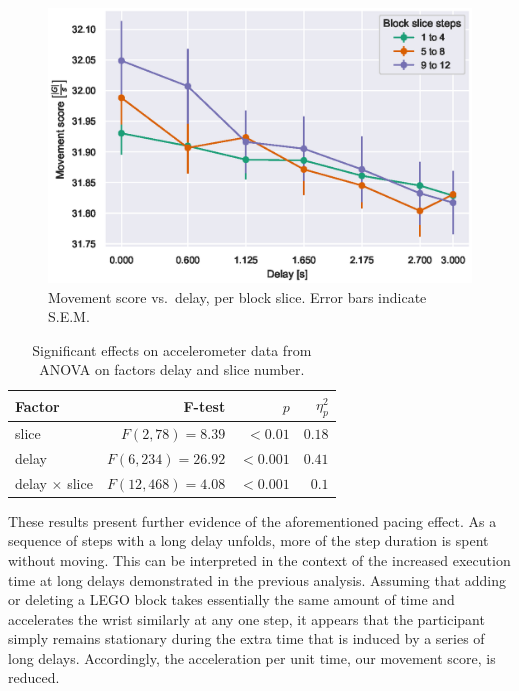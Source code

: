 \documentclass[10pt,letterpaper]{article}
\begin{document}
\begin{figure}[h]
  \centering
  \includegraphics[width=.8\textwidth]{plots/acc_vs_delay_per_slice.eps}
  \caption{Movement score vs.\ delay, per block slice. Error bars indicate S.E.M.}\label{fig:acc:delayslice}
\end{figure}

\begin{table}[h]
  \centering
  \caption{Significant effects on accelerometer data from ANOVA on factors delay and slice number.}\label{tab:anova:acc:slice}
  \setlength{\tabcolsep}{0pt} %
  \begin{tabular*}{\columnwidth}{@{\extracolsep{\fill}\quad}lrrr@{}}
    \toprule
    \textbf{Factor} & \textbf{F-test} & \textbf{\(p\)} & \textbf{\(\eta^{2}_{p}\)} \\
    \midrule 
    slice & \(F(2, 78) = 8.39\) & \(<0.01\) & \(0.18\) \\
    delay & \(F(6, 234) = 26.92\) & \(<0.001\) & \(0.41\) \\
    delay \(\times\) slice & \(F(12, 468) = 4.08\) & \(<0.001\) & \(0.1\) \\
    \bottomrule
  \end{tabular*}%
\end{table}

These results present further evidence of the aforementioned pacing effect.
As a sequence of steps with a long delay unfolds, more of the step duration is spent without moving.
This can be interpreted in the context of the increased execution time at long delays demonstrated in the previous analysis.
Assuming that adding or deleting a LEGO block takes essentially the same amount of time and accelerates the wrist similarly at any one step, it appears that the participant simply remains stationary during the extra time that is induced by a series of long delays.
Accordingly, the acceleration per unit time, our movement score, is reduced.
\end{document}
